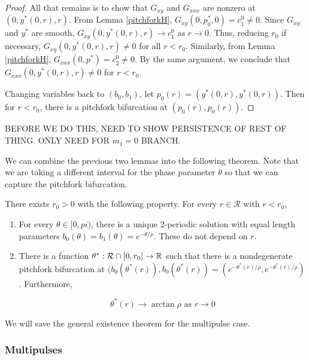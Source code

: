 \documentclass[thesis.tex]{subfiles}
\begin{document}
\begin{lemma}
\begin{proof}
All that remains is to show that $G_{xy}$ and $G_{xxx}$ are nonzero at $(0, y^*(0, r), r)$. From Lemma \ref{pitchforkH}, $G_{xy}(0, p_0^*, 0) = c_1^0 \neq 0$. Since $G_{xy}$ and $y^*$ are smooth, $G_{xy}(0, y^*(0, r), r) \rightarrow c_1^0 \text{ as } r \rightarrow 0$. Thus, reducing $r_0$ if necessary, $G_{xy}(0, y^*(0, r), r) \neq 0$ for all $r < r_0$. Similarly, from Lemma \ref{pitchforkH}, $G_{xxx}(0, p^*) = c_2^0 \neq 0$. By the same argument, we conclude that $G_{xxx}(0, y^*(0, r), r) \neq 0$ for $r < r_0$.

Changing variables back to $(b_0, b_1)$, let $p_0(r) = (y^*(0, r), y^*(0, r))$. Then for $r < r_0$, there is a pitchfork bifurcation at $(p_0(r), p_0(r))$.
\end{proof}
\end{lemma}


BEFORE WE DO THIS, NEED TO SHOW PERSISTENCE OF REST OF THING.
ONLY NEED FOR $m_1 = 0$ BRANCH.


We can combine the previous two lemmas into the following theorem. Note that we are taking a different interval for the phase parameter $\theta$ so that we can capture the pitchfork bifurcation.


\begin{theorem}\label{2pulsebifurcation}
There exists $r_0 > 0$ with the following property. For every $r \in \mathcal{R}$ with $r < r_0$,
\begin{enumerate}
	\item For every $\theta \in [0, pi)$, there is a unique 2-periodic solution with equal length parameters $b_0(\theta) = b_1(\theta) = e^{-\theta/\rho}$. These do not depend on $r$.

	\item There is a function $\theta^*: \mathcal{R} \cap [0, r_0] \rightarrow {\mathbb R}$ such that there is a nondegenerate pitchfork bifurcation at $(b_0(\theta^*(r)),b_0(\theta^*(r)) = (e^{-\theta^*(r)/\rho}, e^{-\theta^*(r)/\rho})$. Furthermore, 

	\begin{equation*}
	\theta^*(r) \rightarrow \arctan \rho \text{ as } r \rightarrow 0
	\end{equation*}
\end{enumerate}
\end{theorem}

We will save the general existence theorem for the multipulse case.

\subsubsection{Multipulses}
\end{document}
